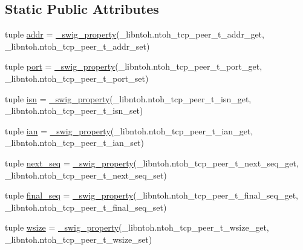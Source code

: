 \subsection*{Static Public Attributes}
\begin{DoxyCompactItemize}
\item 
tuple \hyperlink{classlibntoh_1_1ntoh__tcp__peer__t_a2173c231c978de69ce30d0430739f1a1}{addr} = \hyperlink{namespacelibntoh_ae6f5626f776538e0cdb00e75ca1c96c9}{\-\_\-swig\-\_\-property}(\-\_\-libntoh.\-ntoh\-\_\-tcp\-\_\-peer\-\_\-t\-\_\-addr\-\_\-get, \-\_\-libntoh.\-ntoh\-\_\-tcp\-\_\-peer\-\_\-t\-\_\-addr\-\_\-set)
\item 
tuple \hyperlink{classlibntoh_1_1ntoh__tcp__peer__t_a1aadf525515ecfcf662c2aa51a503763}{port} = \hyperlink{namespacelibntoh_ae6f5626f776538e0cdb00e75ca1c96c9}{\-\_\-swig\-\_\-property}(\-\_\-libntoh.\-ntoh\-\_\-tcp\-\_\-peer\-\_\-t\-\_\-port\-\_\-get, \-\_\-libntoh.\-ntoh\-\_\-tcp\-\_\-peer\-\_\-t\-\_\-port\-\_\-set)
\item 
tuple \hyperlink{classlibntoh_1_1ntoh__tcp__peer__t_ab2f25f00739a355b0b11009767cebff1}{isn} = \hyperlink{namespacelibntoh_ae6f5626f776538e0cdb00e75ca1c96c9}{\-\_\-swig\-\_\-property}(\-\_\-libntoh.\-ntoh\-\_\-tcp\-\_\-peer\-\_\-t\-\_\-isn\-\_\-get, \-\_\-libntoh.\-ntoh\-\_\-tcp\-\_\-peer\-\_\-t\-\_\-isn\-\_\-set)
\item 
tuple \hyperlink{classlibntoh_1_1ntoh__tcp__peer__t_a6df1b754c46aba0b045b242e7db0fc73}{ian} = \hyperlink{namespacelibntoh_ae6f5626f776538e0cdb00e75ca1c96c9}{\-\_\-swig\-\_\-property}(\-\_\-libntoh.\-ntoh\-\_\-tcp\-\_\-peer\-\_\-t\-\_\-ian\-\_\-get, \-\_\-libntoh.\-ntoh\-\_\-tcp\-\_\-peer\-\_\-t\-\_\-ian\-\_\-set)
\item 
tuple \hyperlink{classlibntoh_1_1ntoh__tcp__peer__t_a48a6c283c2a56902dcf6b858f9e2ec46}{next\-\_\-seq} = \hyperlink{namespacelibntoh_ae6f5626f776538e0cdb00e75ca1c96c9}{\-\_\-swig\-\_\-property}(\-\_\-libntoh.\-ntoh\-\_\-tcp\-\_\-peer\-\_\-t\-\_\-next\-\_\-seq\-\_\-get, \-\_\-libntoh.\-ntoh\-\_\-tcp\-\_\-peer\-\_\-t\-\_\-next\-\_\-seq\-\_\-set)
\item 
tuple \hyperlink{classlibntoh_1_1ntoh__tcp__peer__t_acfbf6a8704c9a239a68087d6340fc2ab}{final\-\_\-seq} = \hyperlink{namespacelibntoh_ae6f5626f776538e0cdb00e75ca1c96c9}{\-\_\-swig\-\_\-property}(\-\_\-libntoh.\-ntoh\-\_\-tcp\-\_\-peer\-\_\-t\-\_\-final\-\_\-seq\-\_\-get, \-\_\-libntoh.\-ntoh\-\_\-tcp\-\_\-peer\-\_\-t\-\_\-final\-\_\-seq\-\_\-set)
\item 
tuple \hyperlink{classlibntoh_1_1ntoh__tcp__peer__t_a67662bf2129e6e2477a14aa1b8373e65}{wsize} = \hyperlink{namespacelibntoh_ae6f5626f776538e0cdb00e75ca1c96c9}{\-\_\-swig\-\_\-property}(\-\_\-libntoh.\-ntoh\-\_\-tcp\-\_\-peer\-\_\-t\-\_\-wsize\-\_\-get, \-\_\-libntoh.\-ntoh\-\_\-tcp\-\_\-peer\-\_\-t\-\_\-wsize\-\_\-set)

\end{DoxyCompactItemize}
